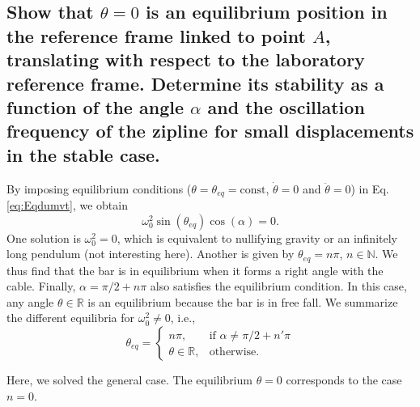 \documentclass[11pt,a4paper]{exam}
\begin{document}
\begin{parts}
\part{Show that $\theta=0$ is an equilibrium position in the reference frame linked to point $A$, translating with respect to the laboratory reference frame.
Determine its stability as a function of the angle $\alpha$ and the oscillation frequency of the zipline for small displacements in the stable case.}
    \par\vspace{2mm}
    By imposing equilibrium conditions ($\theta = \theta_{eq} = \textrm{const}$, $\dot \theta = 0 $ and $\ddot \theta = 0$) in Eq. \eqref{eq:Eqdumvt}, we obtain
    \begin{equation}
         \omega_0^2 \sin(\theta_{eq}) \cos(\alpha)  = 0. \label{eq:thetaeq}
    \end{equation}
    One solution is $\omega_0^2 =0$, which is equivalent to nullifying gravity or an infinitely long pendulum (not interesting here).
    Another is given by $\theta_{eq}=n\pi$, $n \in \mathbb N$. 
    We thus find that the bar is in equilibrium when it forms a right angle with the cable.
    Finally, $\alpha=\pi/2+n\pi$ also satisfies the equilibrium condition.
    In this case, any angle $\theta \in \mathbb R$ is an equilibrium because the bar is in free fall.
    We summarize the different equilibria for $\omega_0^2\neq 0$, i.e.,
    \begin{equation}
        \theta_{eq}= 
    \begin{cases}
        n\pi,& \text{if } \alpha\neq\pi/2 + n'\pi\\
        \theta\in\mathbb R, & \text{otherwise}.
    \end{cases}
    \label{eq:thetaeqs}
    \end{equation}
    
    Here, we solved the general case. 
    The equilibrium $\theta=0$ corresponds to the case $n=0$.
    

\end{parts}
\end{document}
